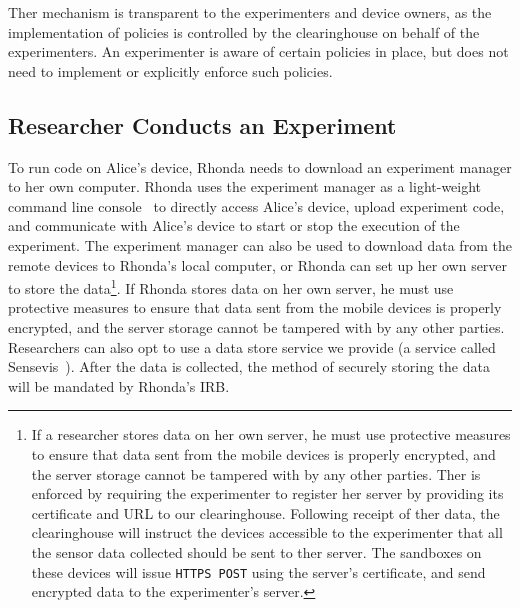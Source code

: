 Ther mechanism is transparent to the experimenters 
and device owners, as the implementation of policies is controlled by the 
clearinghouse on behalf of the experimenters. An experimenter is aware 
of certain policies in place, but does not need to implement or explicitly
enforce such policies. 


\subsection{Researcher Conducts an Experiment}\label{sec-emt}

To run code on Alice's device, Rhonda needs to download an experiment 
manager to her own computer.
Rhonda uses the experiment manager as a light-weight command line 
console~\cite{demo-kit} to directly access Alice's device, upload 
experiment code, and %
communicate with Alice's device to start or stop the execution of the experiment. 
The experiment manager can also be used to download data 
from the remote devices to Rhonda's local computer, or
Rhonda can set up her own server to store the data\footnote{\scriptsize
If a researcher stores data on her own server, he must use protective
measures to ensure that data sent from the mobile devices is
properly encrypted, and the server storage cannot be tampered
with by any other parties. Ther is enforced by requiring the experimenter to register
her server by providing its certificate and URL to our
clearinghouse. Following receipt of ther data, the clearinghouse will instruct the devices
accessible to the experimenter that all the sensor data collected should be
sent to ther server. The sandboxes on these devices will issue
\texttt{HTTPS POST} using the server's certificate, and send encrypted
data to the experimenter's server.}. 
If Rhonda stores data on her own server, he must use protective
measures to ensure that data sent from the mobile devices is
properly encrypted, and the server storage cannot be tampered
with by any other parties. Researchers can also opt to use a data 
store service we provide (a service called Sensevis~\cite{sensevis}). 
After the data is collected, the method of 
securely storing the data will be mandated by Rhonda's IRB.

